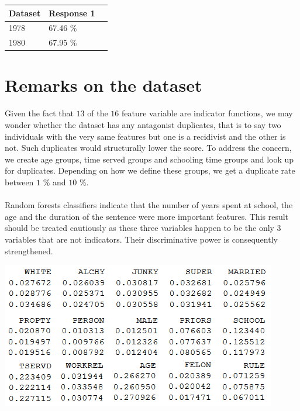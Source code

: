 \documentclass[a0,landscape]{a0poster}
\begin{document}
\begin{multicols}{4}
\begin{center}\vspace{1cm}
\begin{tabular}{l l l}
\toprule
\textbf{Dataset} & \textbf{Response 1} \\
\midrule
1978 & 67.46 \%  \\
1980 & 67.95 \%  \\
\bottomrule
\end{tabular}
\end{center}\vspace{1cm}


\section*{Remarks on the dataset}

Given the fact that $13$ of the $16$ feature variable are indicator functions, we may wonder whether the dataset has any antagonist duplicates, that is to say two individuals with the very same features but one is a recidivist and the other is not. Such duplicates would structurally lower the score. To address the concern, we create age groups, time served groups and schooling time groups and look up for duplicates. Depending on how we define these groups, we get a duplicate rate between $1$ \% and $10$ \%.

\paragraph{}
Random forests classifiers indicate that the number of years spent at school, the age and the duration of the sentence were more important features. This result should be treated cautiously as these three variables happen to be the only 3 variables that are not indicators. Their discriminative power is consequently strengthened.

\begin{center}\vspace{1cm}
  \includegraphics[width=\linewidth]{features_weights.png}
\end{center}\vspace{1cm}



\end{multicols}
\end{document}
